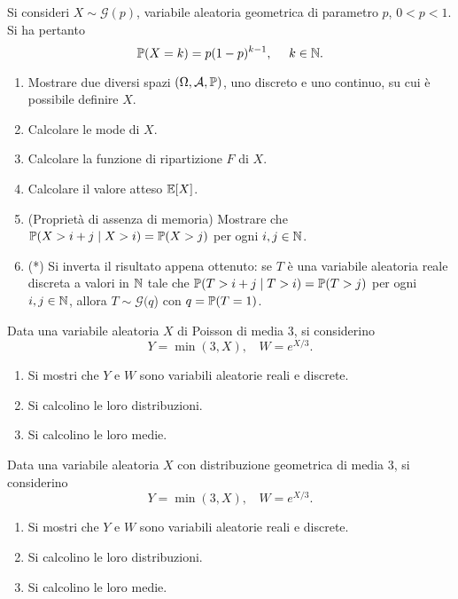 Si consideri $X\sim \mathcal{G}(p)$, variabile aleatoria geometrica di parametro $p$, $0< p< 1$. Si ha pertanto
\begin{equation*}
\PP(X=k) =p(1-p)^{k-1} ,\ \ \ \ k\in \NN .
\end{equation*}
\begin{enumerate}
\item Mostrare due diversi spazi $(\Omega,\mathcal{A},\mathbb{P})$, uno discreto e uno continuo, su cui è possibile definire $X$.
\item Calcolare le mode di $X$.
\item Calcolare la funzione di ripartizione $F$ di $X$.
\item Calcolare il valore atteso $\mathbb{E}[X]$.
\item (Proprietà di assenza di memoria) Mostrare che $\mathbb{P}(X >i+j\mid X >i) =\mathbb{P}(X >j)$ per ogni $i,j\in \mathbb{N}$.
\item (*) Si inverta il risultato appena ottenuto: se $T$ è una variabile aleatoria reale discreta a valori in $\mathbb{N}$ tale che $\mathbb{P}(T >i+j\mid T >i) =\mathbb{P}(T >j)$ per ogni $i,j\in \mathbb{N}$, allora $T\sim \mathcal{G}(q$) con $q=\mathbb{P}(T=1)$.
\end{enumerate}

\Esercizio{}

Data una variabile aleatoria $X$ di Poisson di media $3$, si considerino
\begin{equation*}
Y=\min(3,X) ,\ \ \ \ W=e^{X/3} .
\end{equation*}
\begin{enumerate}
\item Si mostri che $Y$ e $W$ sono variabili aleatorie reali e discrete.
\item Si calcolino le loro distribuzioni.
\item Si calcolino le loro medie.
\end{enumerate}

\Esercizio{}

Data una variabile aleatoria $X$ con distribuzione geometrica di media $3$, si considerino
\begin{equation*}
Y=\min(3,X) ,\ \ \ \ W=e^{X/3} .
\end{equation*}
\begin{enumerate}
\item Si mostri che $Y$ e $W$ sono variabili aleatorie reali e discrete.
\item Si calcolino le loro distribuzioni.
\item Si calcolino le loro medie.
\end{enumerate}

